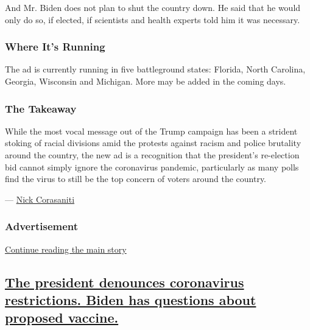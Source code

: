 And Mr. Biden does not plan to shut the country down. He said that he
would only do so, if elected, if scientists and health experts told him
it was necessary.

\hypertarget{where-its-running}{%
\subsubsection{Where It's Running}\label{where-its-running}}

The ad is currently running in five battleground states: Florida, North
Carolina, Georgia, Wisconsin and Michigan. More may be added in the
coming days.

\hypertarget{the-takeaway}{%
\subsubsection{The Takeaway}\label{the-takeaway}}

While the most vocal message out of the Trump campaign has been a
strident stoking of racial divisions amid the protests against racism
and police brutality around the country, the new ad is a recognition
that the president's re-election bid cannot simply ignore the
coronavirus pandemic, particularly as many polls find the virus to still
be the top concern of voters around the country.

--- \href{https://www.nytimes3xbfgragh.onion/by/nick-corasaniti}{Nick
Corasaniti}

\hypertarget{advertisement-1}{%
\subsubsection{Advertisement}\label{advertisement-1}}

\protect\hyperlink{after-dfp-ad-mid2}{Continue reading the main story}

\hypertarget{the-president-denounces-coronavirus-restrictions-biden-has-questions-about-proposed-vaccine}{%
\subsection{\texorpdfstring{\protect\hyperlink{the-president-denounces-coronavirus-restrictions-biden-has-questions-about-proposed-vaccine}{The
president denounces coronavirus restrictions. Biden has questions about
proposed
vaccine.}}{The president denounces coronavirus restrictions. Biden has questions about proposed vaccine.}}\label{the-president-denounces-coronavirus-restrictions-biden-has-questions-about-proposed-vaccine}}

